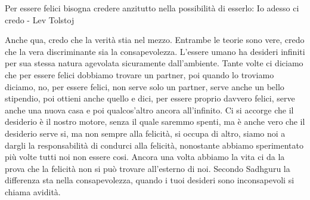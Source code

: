 \documentclass[12pt]{book} %
\begin{document}
Per essere felici bisogna credere anzitutto nella possibilità di esserlo: Io adesso ci credo - Lev Tolstoj 

Anche qua, credo che la verità stia nel mezzo. Entrambe le teorie sono vere, credo che la vera discriminante sia la
consapevolezza. L'essere umano ha desideri infiniti per sua stessa natura agevolata sicuramente
dall'ambiente. Tante volte ci diciamo che per essere felici dobbiamo trovare un partner, poi
quando lo troviamo diciamo, no, per essere felici, non serve solo un partner, serve anche un bello stipendio, poi
ottieni anche quello e dici, per essere proprio davvero felici, serve anche una nuova casa e poi
qualcos'altro ancora all'infinito. Ci si accorge che il desiderio è il nostro
motore, senza il quale saremmo spenti, ma è anche vero che il desiderio serve si, ma non sempre alla felicità, si
occupa di altro, siamo noi a dargli la responsabilità di condurci alla felicità, nonostante abbiamo sperimentato più
volte tutti noi non essere cosi. Ancora una volta abbiamo la vita ci da la prova che la felicità non si può trovare
all'esterno di noi. Secondo Sadhguru la differenza sta nella consapevolezza, quando i tuoi
desideri sono inconsapevoli si chiama avidità. 
\end{document}

